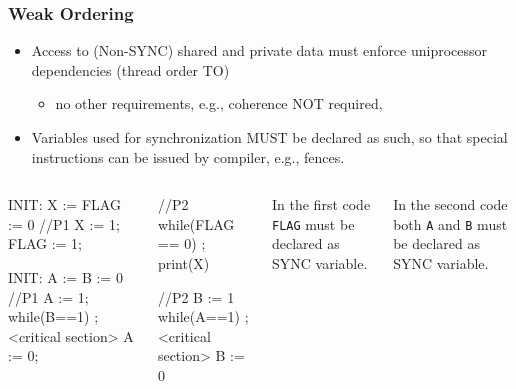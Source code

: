\documentclass{beamer}
\begin{document}
\begin{frame}[fragile,t]
\frametitle{Weak Ordering}

\begin{itemize}
    \item Access to (Non-SYNC) shared and private data must enforce 
            uniprocessor dependencies (thread order TO) \medskip
        \begin{itemize}
            \item no other requirements, e.g., coherence NOT required,
        \end  {itemize}\medskip

    \item Variables used for synchronization MUST be declared as such,
            so that special instructions can be issued by compiler, 
            e.g., fences.
\end{itemize}

\begin{columns}
\begin{colorcode}
        INIT: X := FLAG := 0
//P1
X    := 1;
\alert{FLAG} := 1;

        INIT: A := B := 0
//P1
\alert{A} := 1;
while(\alert{B}==1) ;
<critical section>
\alert{A} := 0;
\end{colorcode} 
\begin{colorcode}

//P2
while(\alert{FLAG} == 0) ;
print(X)


//P2
\alert{B} := 1
while(\alert{A}==1) ;
<critical section>
\alert{B} := 0
\end{colorcode} 
In the first code {\tt FLAG} must be declared as SYNC variable.\bigskip

In the second code both {\tt A} and {\tt B} must be declared as SYNC variable.
\end{columns}
\end{frame}
\end{document}
